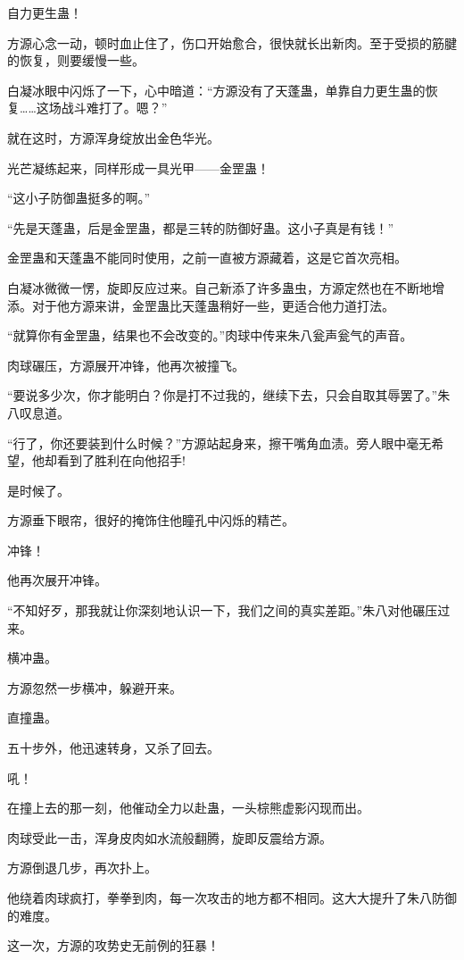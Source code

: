\begin{this_body}
自力更生蛊！

方源心念一动，顿时血止住了，伤口开始愈合，很快就长出新肉。至于受损的筋腱的恢复，则要缓慢一些。

白凝冰眼中闪烁了一下，心中暗道：“方源没有了天蓬蛊，单靠自力更生蛊的恢复……这场战斗难打了。嗯？”

就在这时，方源浑身绽放出金色华光。

光芒凝练起来，同样形成一具光甲——金罡蛊！

“这小子防御蛊挺多的啊。”

“先是天蓬蛊，后是金罡蛊，都是三转的防御好蛊。这小子真是有钱！”

金罡蛊和天蓬蛊不能同时使用，之前一直被方源藏着，这是它首次亮相。

白凝冰微微一愣，旋即反应过来。自己新添了许多蛊虫，方源定然也在不断地增添。对于他方源来讲，金罡蛊比天蓬蛊稍好一些，更适合他力道打法。

“就算你有金罡蛊，结果也不会改变的。”肉球中传来朱八瓮声瓮气的声音。

肉球碾压，方源展开冲锋，他再次被撞飞。

“要说多少次，你才能明白？你是打不过我的，继续下去，只会自取其辱罢了。”朱八叹息道。

“行了，你还要装到什么时候？”方源站起身来，擦干嘴角血渍。旁人眼中毫无希望，他却看到了胜利在向他招手!

是时候了。

方源垂下眼帘，很好的掩饰住他瞳孔中闪烁的精芒。

冲锋！

他再次展开冲锋。

“不知好歹，那我就让你深刻地认识一下，我们之间的真实差距。”朱八对他碾压过来。

横冲蛊。

方源忽然一步横冲，躲避开来。

直撞蛊。

五十步外，他迅速转身，又杀了回去。

吼！

在撞上去的那一刻，他催动全力以赴蛊，一头棕熊虚影闪现而出。

肉球受此一击，浑身皮肉如水流般翻腾，旋即反震给方源。

方源倒退几步，再次扑上。

他绕着肉球疯打，拳拳到肉，每一次攻击的地方都不相同。这大大提升了朱八防御的难度。

这一次，方源的攻势史无前例的狂暴！


\end{this_body}
